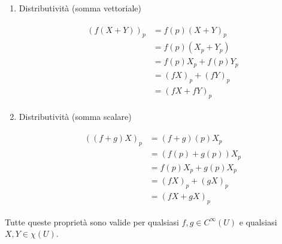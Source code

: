 {\begin{enumerate}
	\item Distributività (somma vettoriale)
	
	\begin{align}
		\begin{split}
			(f (X + Y))_{p} &= f (p) (X + Y)_{p} \\
			&= f (p) (X_{p} + Y_{p}) \\
			&= f (p) X_{p} + f (p) Y_{p} \\
			&= (f X)_{p} + (f Y)_{p} \\
			&= (f X + f Y)_{p}
		\end{split}
	\end{align}
	
	\item Distributività (somma scalare)
	
	\begin{align}
		\begin{split}
			((f + g) X)_{p} &= (f + g) (p) X_{p} \\
			&= (f (p) + g (p)) X_{p} \\
			&= f (p) X_{p} + g (p) X_{p} \\
			&= (f X)_{p} + (g X)_{p} \\
			&= (f X + g X)_{p}
		\end{split}
	\end{align}
\end{enumerate}

Tutte queste proprietà sono valide per qualsiasi $ f,g \in C^{\infty}(U) $ e qualsiasi $ X,Y \in \chi(U) $.
}


